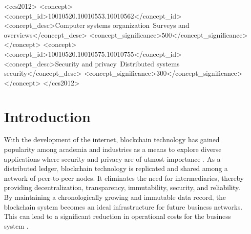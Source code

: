 \documentclass[manuscript,screen]{acmart}
\begin{document}
\begin{CCSXML}
<ccs2012>
 <concept>
  <concept_id>10010520.10010553.10010562</concept_id>
  <concept_desc>Computer systems organization~Surveys and overviews</concept_desc>
  <concept_significance>500</concept_significance>
 </concept>
 <concept>
  <concept_id>10010520.10010575.10010755</concept_id>
  <concept_desc>Security and privacy~Distributed systems security</concept_desc>
  <concept_significance>300</concept_significance>
 </concept>
</ccs2012>
\end{CCSXML}




\maketitle

\section{Introduction}
With the development of the internet, blockchain technology has gained popularity among academia and industries as a means to explore diverse applications where security and privacy are of utmost importance \cite{wood2014ethereum, hughes2019blockchain}.
As a distributed ledger, blockchain technology is replicated and shared among a network of peer-to-peer nodes. It eliminates the need for intermediaries, thereby providing decentralization, transparency, immutability, security, and reliability. By maintaining a chronologically growing and immutable data record, the blockchain system becomes an ideal infrastructure for future business networks. This can lead to a significant reduction in operational costs for the business system \cite{casino2019systematic}.
\end{document}
